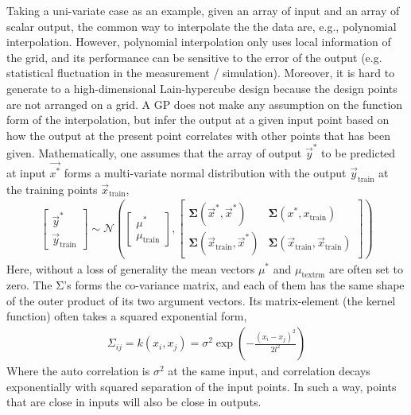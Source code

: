 Taking a uni-variate case as an example, given an array of input and an array of scalar output, the common way to interpolate the the data are, e.g., polynomial interpolation.
However, polynomial interpolation only uses local information of the grid, and its performance can be sensitive to the error of the output (e.g. statistical fluctuation in the measurement / simulation).
Moreover, it is hard to generate to a high-dimensional Lain-hypercube design because the design points are not arranged on a grid.
A GP does not make any assumption on the function form of the interpolation, but infer the output at a given input point based on how the output at the present point correlates with other points that has been given.
Mathematically, one assumes that the array of output $\vec{y}^*$ to be predicted at input $\vec{x^*}$ forms a multi-variate normal distribution with the output $\vec{y}_{\textrm{train}}$ at the training points $\vec{x}_{\textrm{train}}$,
\begin{eqnarray}
\begin{bmatrix}
\vec{y}^* \\
\vec{y}_{\textrm{train}}
\end{bmatrix}
\sim
\mathcal{N}\left(
\begin{bmatrix}
\mu^* \\
\mu_{\textrm{train}}
\end{bmatrix},
\begin{bmatrix}
\mathbf{\Sigma}(\vec{x}^*, \vec{x}^*)& \mathbf{\Sigma}(x^*, x_{\textrm{train}}) \\
\mathbf{\Sigma}(\vec{x}_{\textrm{train}}, \vec{x}^*)& \mathbf{\Sigma}(\vec{x}_{\textrm{train}}, \vec{x}_{\textrm{train}})
\end{bmatrix}
\right)
\end{eqnarray}
Here, without a loss of generality the mean vectors $\mu^*$ and $\mu_{\textrm{textrm}}$ are often set to zero.
The $\mathrm{\Sigma}$'s forms the co-variance matrix, and each of them has the same shape of the outer product of its two argument vectors.
Its matrix-element (the kernel function) often takes a squared exponential form,
\begin{eqnarray}
\Sigma_{ij} = k(x_i, x_j) = \sigma^2 \exp\left(-\frac{(x_i-x_j)^2}{2l^2}\right) 
\end{eqnarray}
Where the auto correlation is $\sigma^2$ at the same input, and correlation decays exponentially with squared separation of the input points.
In such a way, points that are close in inputs will also be close in outputs.


